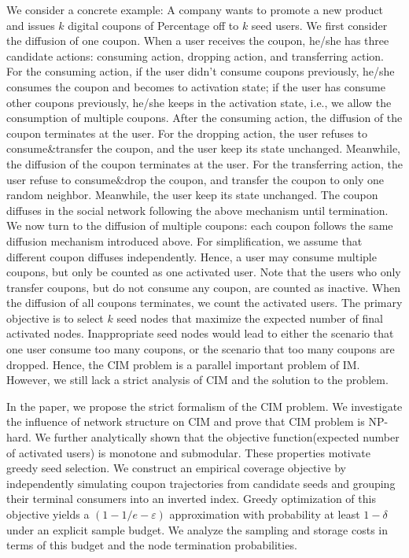 \documentclass[sigconf]{acmart}
\begin{document}
We consider a concrete example:
A company wants to promote a new product and issues $k$ digital coupons of Percentage off
to $k$ seed users. We first consider the diffusion of one coupon. When a user receives the coupon, he/she has three candidate actions: consuming action, dropping action, and transferring action. For the consuming action, if the user didn't consume coupons previously, he/she consumes the coupon and becomes to activation state; if the user has consume other coupons previously, he/she keeps in the activation state, i.e., we allow the consumption of multiple coupons. After the consuming action, the diffusion of the coupon terminates at the user.
 For the dropping action, the user refuses to consume\&transfer the coupon, and the user keep its state unchanged. Meanwhile, the diffusion of the coupon terminates at the user.
 For the transferring action, the user refuse to consume\&drop the coupon, and transfer the coupon to only one random neighbor. Meanwhile, the user keep its state unchanged. The coupon diffuses in the social network following the above mechanism until termination. We now turn to the diffusion of multiple coupons: each coupon follows the same diffusion mechanism introduced above.
  For simplification, we assume that different coupon diffuses independently. Hence, a user may consume multiple coupons, but only be counted as one activated user. Note that the users who only transfer coupons, but do not consume any coupon, are counted as inactive. 
 When the diffusion of all coupons terminates, we count the activated users. 
The primary objective is to select $k$ seed nodes that maximize the
expected number of final activated nodes. Inappropriate seed nodes would lead to either the scenario that one user consume too many coupons, or the scenario that too many coupons are dropped. Hence, the CIM problem is a parallel important problem of IM. However, we still lack a strict analysis of CIM and the solution to the problem.


In the paper, we propose the strict formalism of the CIM problem. We investigate the influence of network structure on CIM and prove that CIM problem is NP-hard. We further analytically shown that 
the objective function(expected number of activated users) is monotone and submodular. These properties motivate greedy seed selection. We construct an empirical coverage objective by independently simulating coupon trajectories from candidate seeds and grouping their terminal consumers into an inverted index. Greedy optimization of this objective yields a $(1-1/e-\varepsilon)$ approximation with probability at least $1-\delta$ under an explicit sample budget. We analyze the sampling and storage costs in terms of this budget and the node termination probabilities.
\end{document}
